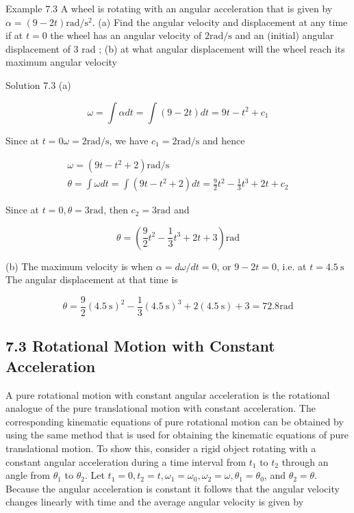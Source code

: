 \documentclass[10pt]{article}
\begin{document}
Example 7.3 A wheel is rotating with an angular acceleration that is given by $\alpha=(9-2 t) \mathrm{rad} / \mathrm{s}^{2}$. (a) Find the angular velocity and displacement at any time if at $t=0$ the wheel has an angular velocity of $2 \mathrm{rad} / \mathrm{s}$ and an (initial) angular displacement of 3 rad ; (b) at what angular displacement will the wheel reach its maximum angular velocity

Solution 7.3 (a)

$$
\omega=\int \alpha d t=\int(9-2 t) d t=9 t-t^{2}+c_{1}
$$

Since at $t=0 \omega=2 \mathrm{rad} / \mathrm{s}$, we have $c_{1}=2 \mathrm{rad} / \mathrm{s}$ and hence

$$
\begin{gathered}
\omega=\left(9 t-t^{2}+2\right) \mathrm{rad} / \mathrm{s} \\
\theta=\int \omega d t=\int\left(9 t-t^{2}+2\right) d t=\frac{9}{2} t^{2}-\frac{1}{3} t^{3}+2 t+c_{2}
\end{gathered}
$$

Since at $t=0, \theta=3 \mathrm{rad}$, then $c_{2}=3 \mathrm{rad}$ and

$$
\theta=\left(\frac{9}{2} t^{2}-\frac{1}{3} t^{3}+2 t+3\right) \mathrm{rad}
$$

(b) The maximum velocity is when $\alpha=d \omega / d t=0$, or $9-2 t=0$, i.e. at $t=4.5 \mathrm{~s}$ The angular displacement at that time is

$$
\theta=\frac{9}{2}(4.5 \mathrm{~s})^{2}-\frac{1}{3}(4.5 \mathrm{~s})^{3}+2(4.5 \mathrm{~s})+3=72.8 \mathrm{rad}
$$

\subsection*{7.3 Rotational Motion with Constant Acceleration}
A pure rotational motion with constant angular acceleration is the rotational analogue of the pure translational motion with constant acceleration. The corresponding kinematic equations of pure rotational motion can be obtained by using the same method that is used for obtaining the kinematic equations of pure translational motion. To show this, consider a rigid object rotating with a constant angular acceleration during a time interval from $t_{1}$ to $t_{2}$ through an angle from $\theta_{1}$ to $\theta_{2}$. Let $t_{1}=0, t_{2}=t, \omega_{1}=\omega_{0}, \omega_{2}=\omega, \theta_{1}=\theta_{0}$, and $\theta_{2}=\theta$. Because the angular acceleration is constant it follows that the angular velocity changes linearly with time and the average angular velocity is given by
\end{document}
